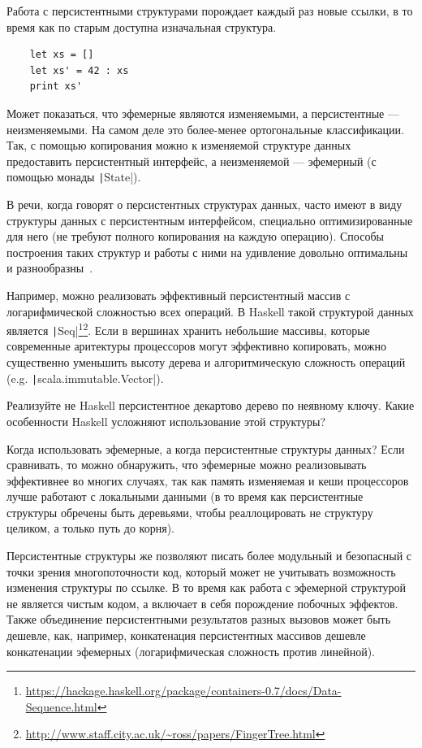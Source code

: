 Работа с персистентными структурами порождает каждый раз новые ссылки, в то время как по старым доступна изначальная структура.
\begin{verbatim}
    let xs = []
    let xs' = 42 : xs
    print xs'
\end{verbatim}

Может показаться, что эфемерные являются изменяемыми, а персистентные --- неизменяемыми.
На самом деле это более-менее ортогональные классификации.
Так, с помощью копирования можно к изменяемой структуре данных предоставить персистентный интерфейс, а неизменяемой --- эфемерный (с помощью монады \texttt|State|).

В речи, когда говорят о персистентных структурах данных, часто имеют в виду структуры данных с персистентным интерфейсом, специально оптимизированные для него (не требуют полного копирования на каждую операцию).
Способы построения таких структур и работы с ними на удивление довольно оптимальны и разнообразны~\cite{okasaki1999purely}.

Например, можно реализовать эффективный персистентный массив с логарифмической сложностью всех операций.
В Haskell такой структурой данных является \texttt|Seq|\footnote{\url{https://hackage.haskell.org/package/containers-0.7/docs/Data-Sequence.html}}\footnote{\url{http://www.staff.city.ac.uk/~ross/papers/FingerTree.html}}.
Если в вершинах хранить небольшие массивы, которые современные аритектуры процессоров могут эффективно копировать, можно существенно уменьшить высоту дерева и алгоритмическую сложность операций (e.g. \texttt|scala.immutable.Vector|).

\begin{task}
    Реализуйте не Haskell персистентное декартово дерево по неявному ключу.
    Какие особенности Haskell усложняют использование этой структуры?
\end{task}

Когда использовать эфемерные, а когда персистентные структуры данных?
Если сравнивать, то можно обнаружить, что эфемерные можно реализовывать эффективнее во многих случаях, так как память изменяемая и кеши процессоров лучше работают с локальными данными (в то время как персистентные структуры обречены быть деревьями, чтобы реаллоцировать не структуру целиком, а только путь до корня).

Персистентные структуры же позволяют писать более модульный и безопасный с точки зрения многопоточности код, который может не учитывать возможность изменения структуры по ссылке.
В то время как работа с эфемерной структурой не является чистым кодом, а включает в себя порождение побочных эффектов.
Также объединение персистентными результатов разных вызовов может быть дешевле, как, например, конкатенация персистентных массивов дешевле конкатенации эфемерных (логарифмическая сложность против линейной).

